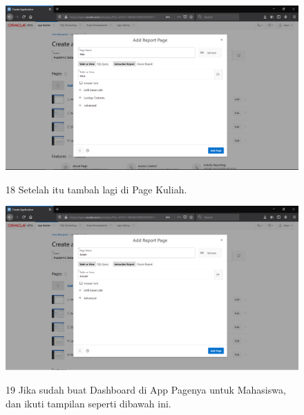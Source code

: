 \begin{enumerate}
\begin{figure}
    \begin{center}
\includegraphics[scale=0.2]{figures/31.png}
    \caption{\textit{}}
        \end{center}
\label{gambar}
\end{figure}


\begin{figure}
\item[18]Setelah itu tambah lagi di Page Kuliah.

    \begin{center}
\includegraphics[scale=0.2]{figures/32.png}
    \caption{\textit{}}
        \end{center}
\label{gambar}
\end{figure}


\begin{figure}
\item[19]Jika sudah buat Dashboard di App Pagenya untuk Mahasiswa, dan ikuti tampilan seperti dibawah ini.


\end{figure}
\end{enumerate}
